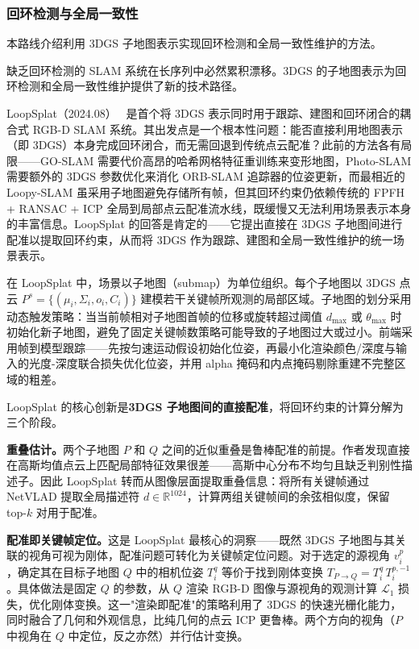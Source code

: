 \subsubsection{回环检测与全局一致性}

本路线介绍利用 3DGS 子地图表示实现回环检测和全局一致性维护的方法。

缺乏回环检测的 SLAM 系统在长序列中必然累积漂移。3DGS 的子地图表示为回环检测和全局一致性维护提供了新的技术路径。

LoopSplat（2024.08）~\cite{2408_10154} 是首个将 3DGS 表示同时用于跟踪、建图和回环闭合的耦合式 RGB-D SLAM 系统。其出发点是一个根本性问题：能否直接利用地图表示（即 3DGS）本身完成回环闭合，而无需回退到传统点云配准？此前的方法各有局限——GO-SLAM 需要代价高昂的哈希网格特征重训练来变形地图，Photo-SLAM 需要额外的 3DGS 参数优化来消化 ORB-SLAM 追踪器的位姿更新，而最相近的 Loopy-SLAM 虽采用子地图避免存储所有帧，但其回环约束仍依赖传统的 FPFH + RANSAC + ICP 全局到局部点云配准流水线，既缓慢又无法利用场景表示本身的丰富信息。LoopSplat 的回答是肯定的——它提出直接在 3DGS 子地图间进行配准以提取回环约束，从而将 3DGS 作为跟踪、建图和全局一致性维护的统一场景表示。

在 LoopSplat 中，场景以子地图（submap）为单位组织。每个子地图以 3DGS 点云 $P^s = \{(\mu_i, \Sigma_i, o_i, C_i)\}$ 建模若干关键帧所观测的局部区域。子地图的划分采用动态触发策略：当当前帧相对子地图首帧的位移或旋转超过阈值 $d_{\max}$ 或 $\theta_{\max}$ 时初始化新子地图，避免了固定关键帧数策略可能导致的子地图过大或过小。前端采用帧到模型跟踪——先按匀速运动假设初始化位姿，再最小化渲染颜色/深度与输入的光度-深度联合损失优化位姿，并用 alpha 掩码和内点掩码剔除重建不完整区域的粗差。

LoopSplat 的核心创新是\textbf{3DGS 子地图间的直接配准}，将回环约束的计算分解为三个阶段。

\textbf{重叠估计。}两个子地图 $P$ 和 $Q$ 之间的近似重叠是鲁棒配准的前提。作者发现直接在高斯均值点云上匹配局部特征效果很差——高斯中心分布不均匀且缺乏判别性描述子。因此 LoopSplat 转而从图像层面提取重叠信息：将所有关键帧通过 NetVLAD 提取全局描述符 $d \in \mathbb{R}^{1024}$，计算两组关键帧间的余弦相似度，保留 top-$k$ 对用于配准。

\textbf{配准即关键帧定位。}这是 LoopSplat 最核心的洞察——既然 3DGS 子地图与其关联的视角可视为刚体，配准问题可转化为关键帧定位问题。对于选定的源视角 $v_i^p$，确定其在目标子地图 $Q$ 中的相机位姿 $T_i^q$ 等价于找到刚体变换 $T_{P \to Q} = T_i^q \, T_i^{p,-1}$。具体做法是固定 $Q$ 的参数，从 $Q$ 渲染 RGB-D 图像与源视角的观测计算 $\mathcal{L}_1$ 损失，优化刚体变换。这一"渲染即配准"的策略利用了 3DGS 的快速光栅化能力，同时融合了几何和外观信息，比纯几何的点云 ICP 更鲁棒。两个方向的视角（$P$ 中视角在 $Q$ 中定位，反之亦然）并行估计变换。

